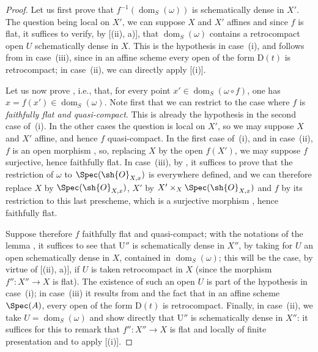 \begin{proof}
Let us first prove that $f^{-1}(\operatorname{dom}_S(\omega))$ is schematically dense in $X'$.
The question being local on $X'$, we can suppose $X$ and $X'$ affines and since $f$ is flat, it suffices to verify, by [(ii), a)], that $\operatorname{dom}_S(\omega)$ contains a retrocompact open $U$ schematically dense in $X$.
This is the hypothesis in case~(i), and follows from  in case~(iii), since in an affine scheme every open of the form $\mathrm{D}(t)$ is retrocompact;
in case~(ii), we can directly apply [(i)].

Let us now prove , i.e., that, for every point $x'\in\operatorname{dom}_S(\omega\circ f)$, one has $x=f(x')\in\operatorname{dom}_S(\omega)$.
Note first that we can restrict to the case where $f$ is \emph{faithfully flat and quasi-compact}.
This is already the hypothesis in the second case of~(i).
In the other cases the question is local on $X'$, so we may suppose $X$ and $X'$ affine, and hence $f$ quasi-compact.
In the first case of~(i), and in case~(ii), $f$ is an open morphism , so, replacing $X$ by the open $f(X')$, we may suppose $f$ surjective, hence faithfully flat.
In case~(iii), by , it suffices to prove that the restriction of $\omega$ to $\Spec(\sh{O}_{X,x})$ is everywhere defined, and we can therefore replace $X$ by $\Spec(\sh{O}_{X,x})$, $X'$ by $X'\times_X\Spec(\sh{O}_{X,x})$ and $f$ by its restriction to this last prescheme, which is a surjective morphism , hence faithfully flat.

Suppose therefore $f$ faithfully flat and quasi-compact;
with the notations of the lemma , it suffices to see that $\mathrm{U}''$ is schematically dense in $X''$, by taking for $U$ an open schematically dense in $X$, contained in $\operatorname{dom}_S(\omega)$;
this will be the case, by virtue of [(ii), a)], if $U$ is taken retrocompact in $X$ (since the morphism $f'':X''\to X$ is flat).
The existence of such an open $U$ is part of the hypothesis in case~(i);
in case~(iii) it results from  and the fact that in an affine scheme $\Spec(A)$, every open of the form $\mathrm{D}(t)$ is retrocompact.
Finally, in case~(ii), we take $U=\operatorname{dom}_S(\omega)$ and show directly that $\mathrm{U}''$ is schematically dense in $X''$:
it suffices for this to remark that $f'':X''\to X$ is flat and locally of finite presentation and to apply [(i)].
\end{proof}

